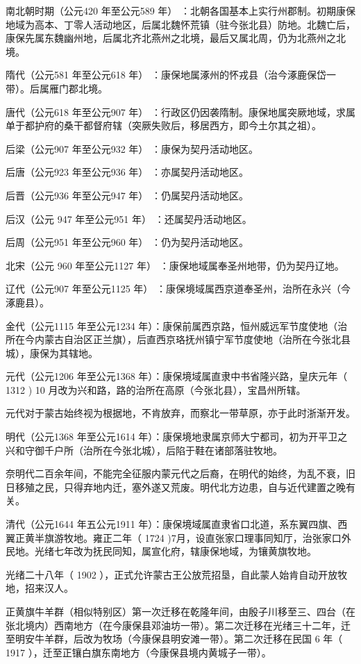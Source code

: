 南北朝时期（公元420 年至公元589 年） ：北朝各国基本上实行州郡制。初期康保地域为高本、丁零人活动地区，后属北魏怀荒镇（驻今张北县）防地。北魏亡后，康保先属东魏幽州地，后属北齐北燕州之北境，最后又属北周，仍为北燕州之北境。

隋代（公元581 年至公元618 年） ：康保地属涿州的怀戎县（治今涿鹿保岱一带）。后属雁门郡北境。

唐代（公元618 年至公元907 年） ：行政区仍因袭隋制。康保地属突厥地域，求属单于都护府的桑干都督府辖（突厥失败后，移居西方，即今土尔其之祖）。

后梁（公元907 年至公元932 年） ：康保为契丹活动地区。

后唐（公元923 年至公元936 年） ：亦属契丹活动地区。

后晋（公元936 年至公元947 年） ：仍属契丹活动地区。

后汉（公元 947 年至公元951 年） ：还属契丹活动地区。

后周（公元951 年至公元960 年） ：仍为契丹活动地区。

北宋（公元 960 年至公元1127 年） ：康保地域属奉圣州地带，仍为契丹辽地。

辽代（公元907 年至公元1125 年） ：康保境域属西京道奉圣州，治所在永兴（今涿鹿县）。

金代（公元1115 年至公元1234 年）：康保前属西京路，恒州威远军节度使地（治所在今内蒙古自治区正兰旗），后直西京珞抚州镇宁军节度使地（治所在今张北县城），康保为其辖地。

元代（公元1206 年至公元1368 年）：康保境域属直隶中书省隆兴路，皇庆元年（ 1312 ) 10 月改为兴和路，路的治所在高原（今张北县），宝昌州所辖。

元代对于蒙古始终视为根据地，不肯放弃，而察北一带草原，亦于此时浙渐开发。

明代（公元1368 年至公元1614 年）：康保境地隶属京师大宁都司，初为开平卫之兴和守御千户所（治所在今张北城），后陷于鞋在诸部落驻牧地。

奈明代二百余年间，不能完全征服内蒙元代之后裔，在明代的始终，为乱不衰，旧日移殖之民，只得弃地内迁，塞外遂又荒废。明代北方边患，自与近代建置之晚有关。

清代（公元1644 年五公元1911 年）：康保境域属直隶省口北道，系东翼四旗、西翼正黄半旗游牧地。雍正二年（ 1724 )7月，设直张家口理事同知厅，治张家口外民地。光绪七年改为抚民同知，属宣化府，辖康保地域，为镶黄旗牧地。

光绪二十八年（ 1902 ），正式允许蒙古王公放荒招垦，自此蒙人始肯自动开放牧地，招来汉人。

正黄旗牛羊群（相似特别区）第一次迁移在乾隆年间，由殷子川移至三、四台（在张北境内）西南地方（在今康保县邓油坊一带）。第二次迁移在光绪三十二年，迁至明安牛羊群，后改为牧场（今康保县明安滩一带）。第二次迁移在民国 6 年（ 1917 ），迁至正镶白旗东南地方（今康保县境内黄城子一带）。

